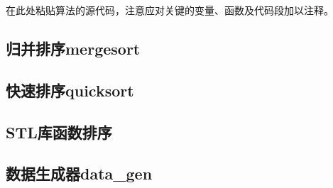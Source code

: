 在此处粘贴算法的源代码，注意应对关键的变量、函数及代码段加以注释。
\subsection{归并排序mergesort}

\subsection{快速排序quicksort}

\subsection{STL库函数排序}

\subsection{数据生成器data\_gen}

